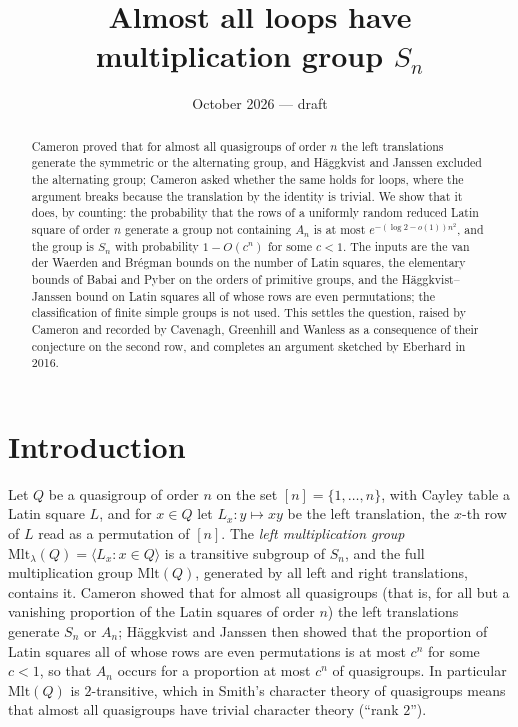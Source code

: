 \documentclass[11pt]{amsart}
\title{Almost all loops have multiplication group $S_n$}
\author{}
\date{October 2026 --- draft}
\theoremstyle{plain}
\theoremstyle{remark}
\newcommand{\Mlt}{\mathrm{Mlt}}
\begin{document}
\maketitle

\begin{abstract}
Cameron proved that for almost all quasigroups of order $n$ the left
translations generate the symmetric or the alternating group, and
H\"aggkvist and Janssen excluded the alternating group; Cameron asked
whether the same holds for loops, where the argument breaks because the
translation by the identity is trivial.  We show that it does, by counting: the
probability that the rows of a uniformly random reduced Latin square of
order $n$ generate a group not containing $A_n$ is at most
$e^{-(\log 2-o(1))n^2}$, and the group is $S_n$ with probability
$1-O(c^n)$ for some $c<1$.  The inputs are the van der Waerden and
Br\'egman bounds on the number of Latin squares, the elementary bounds
of Babai and Pyber on the orders of primitive groups, and the
H\"aggkvist--Janssen bound on Latin squares all of whose rows are even
permutations; the classification of finite simple groups is not used.  This settles the question,
raised by Cameron and recorded by Cavenagh, Greenhill and Wanless as a
consequence of their conjecture on the second row, and completes an
argument sketched by Eberhard in 2016.
\end{abstract}

\section{Introduction}

Let $Q$ be a quasigroup of order $n$ on the set $[n]=\{1,\dots,n\}$,
with Cayley table a Latin square $L$, and for $x\in Q$ let
$L_x\colon y\mapsto xy$ be the left translation, the $x$-th row of $L$
read as a permutation of $[n]$.  The \emph{left multiplication group}
$\Mlt_\lambda(Q)=\langle L_x:x\in Q\rangle$ is a transitive subgroup
of $S_n$, and the full multiplication group $\Mlt(Q)$, generated by all
left and right translations, contains it.  Cameron \cite{Cam92} showed
that for almost all quasigroups (that is, for all but a vanishing
proportion of the Latin squares of order $n$) the left translations
generate $S_n$ or $A_n$; H\"aggkvist and Janssen \cite{HJ96} then showed
that the proportion of Latin squares all of whose rows are even
permutations is at most $c^n$ for some $c<1$, so that $A_n$ occurs for
a proportion at most $c^n$ of quasigroups.  In particular $\Mlt(Q)$ is $2$-transitive, which in Smith's
character theory of quasigroups \cite{Smith} means that almost all
quasigroups have trivial character theory (``rank $2$'').
\end{document}
